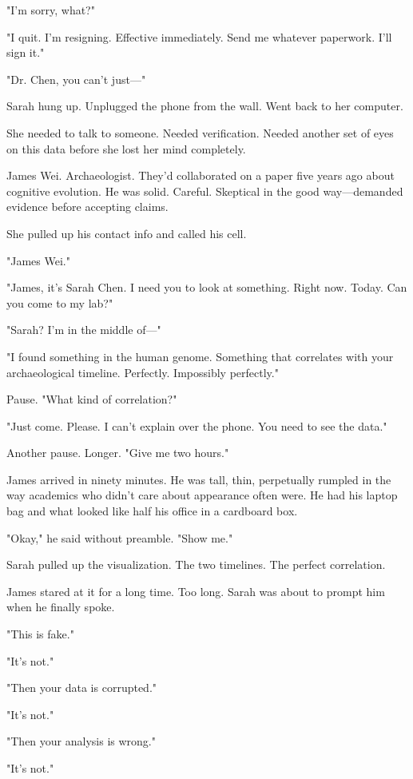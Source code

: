 "I'm sorry, what?"

"I quit. I'm resigning. Effective immediately. Send me whatever paperwork. I'll sign it."

"Dr. Chen, you can't just—"

Sarah hung up. Unplugged the phone from the wall. Went back to her computer.

She needed to talk to someone. Needed verification. Needed another set of eyes on this data before she lost her mind completely.

James Wei. Archaeologist. They'd collaborated on a paper five years ago about cognitive evolution. He was solid. Careful. Skeptical in the good way—demanded evidence before accepting claims.

She pulled up his contact info and called his cell.

"James Wei."

"James, it's Sarah Chen. I need you to look at something. Right now. Today. Can you come to my lab?"

"Sarah? I'm in the middle of—"

"I found something in the human genome. Something that correlates with your archaeological timeline. Perfectly. Impossibly perfectly."

Pause. "What kind of correlation?"

"Just come. Please. I can't explain over the phone. You need to see the data."

Another pause. Longer. "Give me two hours."

\scenebreak

James arrived in ninety minutes. He was tall, thin, perpetually rumpled in the way academics who didn't care about appearance often were. He had his laptop bag and what looked like half his office in a cardboard box.

"Okay," he said without preamble. "Show me."

Sarah pulled up the visualization. The two timelines. The perfect correlation.

James stared at it for a long time. Too long. Sarah was about to prompt him when he finally spoke.

"This is fake."

"It's not."

"Then your data is corrupted."

"It's not."

"Then your analysis is wrong."

"It's not."

